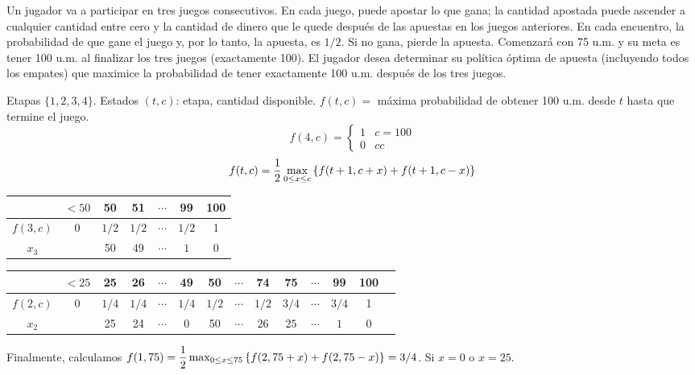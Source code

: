\documentclass[twoside]{article}
\begin{document}
\newpage 
\begin{ejercicio}{6}\label{6}
Un jugador va a participar en tres juegos consecutivos. En cada juego, puede apostar lo que gana; la cantidad apostada puede ascender a cualquier cantidad entre cero y la cantidad de dinero que le quede después de las apuestas en los juegos anteriores. En cada encuentro, la probabilidad de que gane el juego y, por lo tanto, la apuesta, es $1/2$. Si no gana, pierde la apuesta. Comenzará con 75 u.m. y su meta es tener 100 u.m. al finalizar los tres juegos (exactamente 100). El jugador desea determinar su política óptima de apuesta (incluyendo todos los empates) que maximice la probabilidad de tener exactamente 100 u.m. después de los tres juegos.
\end{ejercicio}
\begin{solucion}
Etapas $\{1,2,3,4\}$. Estados $(t,c)$: etapa, cantidad disponible.
$f(t,c)=$ máxima probabilidad de obtener 100 u.m. desde $t$ hasta que termine el juego.
$$f(4,c)=\begin{cases}
1 & c=100\\
0 & cc
\end{cases}$$
$$f(t,c)= \frac{1}{2}\max_{0\leq x\leq c}{\left\{f(t+1,c+x)+f(t+1,c-x)\right\}}$$
\begin{center}
\begin{tabular}{c|cccccc}
		& $<50$	& 50 	& 51 & $\cdots$	& 99 & 100\\
\hline
$f(3,c)$  & 0 			& $1/2$ 	& $1/2$ &$\cdots$& $1/2$ &  1\\
$x_3$     &   			& 50 	& 49 &	$\cdots$ & $1$  &  0\\ 
\end{tabular}
\end{center}

\begin{tabular}{c|ccccccccccccc}
		& $<25$	& 25 	& 26 & 		$\cdots$ & 49	& 50 & $\cdots$ & 74 & 75 & $\cdots$ & 99 & 100\\
\hline
$f(2,c)$  & 0 & $1/4$	& $1/4$ & $\cdots$& $1/4$ & $1/2$ &$\cdots$& $1/2$ & $3/4$ &$\cdots$  & $3/4$ &1\\
$x_2$     &  & 25 & 24 &	$\cdots$ & 0 & 50   & $\cdots$  &$26$ & $25$ & $\cdots$ & $1$ &0\\ 
\end{tabular}

Finalmente, calculamos $f(1,75)=\dfrac{1}{2}\max_{0\leq x\leq 75}{\left\{f(2,75+x)+f(2,75-x)\right\}}=3/4$. Si $x=0$ o $x=25$. 
\end{solucion}
\end{document}
